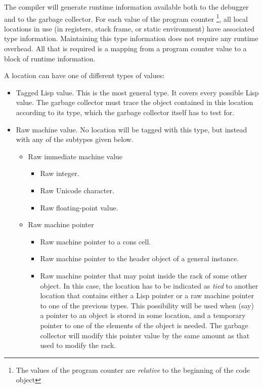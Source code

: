 The compiler will generate runtime information available both to the
debugger and to the garbage collector.  For each value of the program
counter%
\footnote{The values of the program counter are \emph{relative} to the
  beginning of the code object}, all local locations in use (in
registers, stack frame, or static environment) have associated type
information.  Maintaining this type information does not require any
runtime overhead.  All that is required is a mapping from a program
counter value to a block of runtime information.

A location can have one of different types of values:

\begin{itemize}
\item Tagged Lisp value.  This is the most general type.  It covers
  every possible Lisp value.  The garbage collector must trace the
  object contained in this location according to its type, which the
  garbage collector itself has to test for. 
\item Raw machine value.  No location will be tagged with this type,
  but instead with any of the subtypes given below.
  \begin{itemize}
  \item Raw immediate machine value
    \begin{itemize}
      \item Raw integer.
      \item Raw Unicode character.
      \item Raw floating-point value.
    \end{itemize}
  \item Raw machine pointer
    \begin{itemize}
    \item Raw machine pointer to a cons cell.  
    \item Raw machine pointer to the header object of a general
      instance.
    \item Raw machine pointer that may point inside the rack
      of some other object. In this case, the location has to
      be indicated as \emph{tied} to another location that contains
      either a Lisp pointer or a raw machine pointer to one of the
      previous types.  This possibility will be used when (say) a
      pointer to an object is stored in some location, and a temporary
      pointer to one of the elements of the object is needed.  The
      garbage collector will modify this pointer value by the same
      amount as that used to modify the rack. 
    \end{itemize}
  \end{itemize}
\end{itemize}

